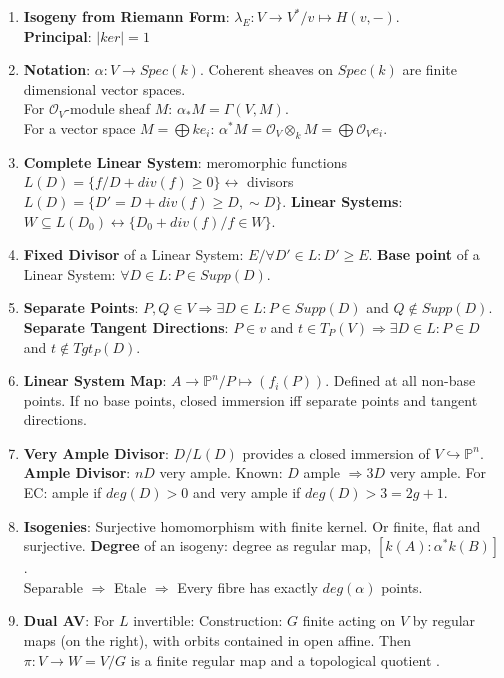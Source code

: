 \documentclass{article}
\newcommand{\PP}{\mathbb{P}}
\newcommand{\OO}{\mathcal{O}}
\newcommand{\ra}{\rightarrow}
\newcommand{\Ra}{\Rightarrow}
\newcommand{\lra}{\leftrightarrow}
\newcommand{\hra}{\hookrightarrow}
\begin{document}
\begin{multicols}{2}
\begin{enumerate}
\item \textbf{Isogeny from Riemann Form}: $\lambda_E: V \ra V^*/ v \mapsto H(v,-)$. \\
\textbf{Principal}: $|ker| = 1$



\item \textbf{Notation}: $\alpha: V \ra Spec(k)$. Coherent sheaves on $Spec(k)$ are finite dimensional vector spaces. \\
For $\OO_V$-module sheaf $M$: $\alpha_*M = \Gamma(V,M)$.\\
For a vector space $M = \bigoplus ke_i$: $\alpha^*M = \OO_V \otimes_k M = \bigoplus \OO_V e_i$.  

\item \textbf{Complete Linear System}: 
meromorphic functions $L(D) = \{f/ D + div(f) \geq 0\} \lra$ divisors $L(D) = \{D' = D + div(f) \geq D, \sim D\}$.  
\textbf{Linear Systems}: $W \subseteq L(D_0) \lra \{D_0 + div(f)/ f \in W\}$. 

\item \textbf{Fixed Divisor} of a Linear System: $E/ \forall D' \in L: D' \geq E$. \textbf{Base point} of a Linear System: $\forall D \in L: P \in Supp(D)$.

\item \textbf{Separate Points}: $P,Q \in V \Ra \exists D \in L: P \in Supp(D)$ and $Q \notin Supp(D)$. \textbf{Separate Tangent Directions}: $P \in v$ and $t \in T_P(V) \Ra \exists D \in L: P \in D$ and $t \notin Tgt_P(D)$. 

\item \textbf{Linear System Map}: $A \ra \PP^n/P \mapsto (f_i(P))$. Defined at all non-base points. If no base points, closed immersion iff separate points and tangent directions. 

\item \textbf{Very Ample Divisor}: $D/L(D)$ provides a closed immersion of $V \hra \PP^n$. \textbf{Ample Divisor}: $nD$ very ample. Known: $D$ ample $\Ra 3D$ very ample. For EC: ample if $deg(D) > 0$ and very ample if $deg(D) > 3 = 2g + 1$. 

\item \textbf{Isogenies}: Surjective homomorphism with finite kernel. Or finite, flat and surjective. \textbf{Degree} of an isogeny: degree as regular map, $[k(A):\alpha^*k(B)]$. \\
Separable $\Ra$ Etale $\Ra$ Every fibre has exactly $deg(\alpha)$ points. 



\item \textbf{Dual AV}: For $L$ invertible: 
Construction: $G$ finite acting on $V$ by regular maps (on the right), with orbits contained in open affine. Then $\pi: V \ra W = V/G$ is a finite regular map and a topological quotient .


\end{enumerate}
\end{multicols}
\end{document}
